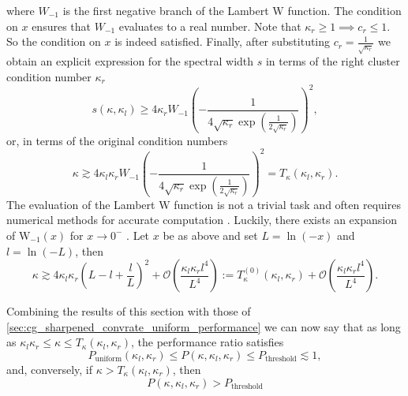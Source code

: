 where $W_{-1}$ is the first negative branch of the Lambert $\mathrm{W}$ function. The condition on $x$ ensures that $W_{-1}$ evaluates to a real number. Note that $\kappa_r\geq1 \implies c_r \leq 1$. So the condition on $x$ is indeed satisfied. Finally, after substituting $c_r = \frac{1}{\sqrt{\kappa_r}}$ we obtain an explicit expression for the spectral width $s$ in terms of the right cluster condition number $\kappa_r$
\[
    s(\kappa, \kappa_l) \geq 4\kappa_r W_{-1}\left(-\frac{1}{4\sqrt{\kappa_r}\exp\left(\frac{1}{2\sqrt{\kappa_r}}\right)}\right)^2,
\]
or, in terms of the original condition numbers
\begin{equation}
    \kappa \gtrsim 4\kappa_l\kappa_r W_{-1}\left(-\frac{1}{4\sqrt{\kappa_r}\exp\left(\frac{1}{2\sqrt{\kappa_r}}\right)}\right)^2 = T_{\kappa}(\kappa_l, \kappa_r).
    \label{eq:threshold_inequality_explicit}    
\end{equation}
The evaluation of the Lambert $\mathrm{W}$ function is not a trivial task and often requires numerical methods for accurate computation \cite{evaluation_of_the_lambert_w_function_Corless1996}. Luckily, there exists an expansion of $\mathrm{W}_{-1}(x)$ for $x\rightarrow0^-$ \cite[Equation 4.19]{evaluation_of_the_lambert_w_function_Corless1996}. Let $x$ be as above and set $L = \ln(-x)$ and $l = \ln(-L)$, then
\begin{equation}
    \kappa \gtrsim 4\kappa_l\kappa_r \left(L - l + \frac{l}{L}\right)^2 + \mathcal{O}\left(\frac{\kappa_l\kappa_rl^4}{L^4}\right) := T^{(0)}_{\kappa}(\kappa_l, \kappa_r) + \mathcal{O}\left(\frac{\kappa_l\kappa_rl^4}{L^4}\right).
    \label{eq:threshold_inequality_explicit_expansion}    
\end{equation}

Combining the results of this section with those of \cref{sec:cg_sharpened_convrate_uniform_performance} we can now say that as long as $\kappa_l\kappa_r \leq \kappa \leq T_{\kappa}(\kappa_l, \kappa_r)$, the performance ratio satisfies
\begin{equation}
    P_{\text{uniform}}(\kappa_l, \kappa_r) \leq P(\kappa, \kappa_l, \kappa_r) \leq P_{\text{threshold}} \lesssim 1,
    \label{eq:performance_bounds}
\end{equation}
and, conversely, if $\kappa > T_{\kappa}(\kappa_l, \kappa_r)$, then 
\[
    P(\kappa, \kappa_l, \kappa_r) > P_{\text{threshold}}
\]

